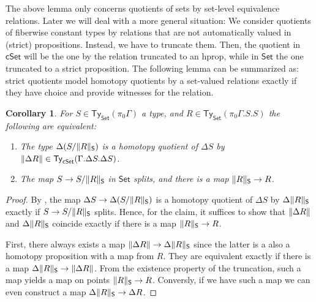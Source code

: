 \documentclass[10pt,a4paper]{article}
\newtheorem{corollary}{Corollary}[section]
\newcommand{\Set}{\mathsf{Set}}
\newcommand{\cSet}{\mathsf{cSet}}
\newcommand\Ty{\mathsf{Ty}}
\begin{document}
The above lemma only concerns quotients of sets by set-level equivalence relations.
Later we will deal with a more general situation: We consider quotients of fiberwise constant types by relations that are not automatically valued in (strict) propositions.
Instead, we have to truncate them.
Then, the quotient in \(\cSet\) will be the one by the relation truncated to an hprop, while in \(\Set\) the one truncated to a strict proposition.
The following lemma can be summarized as: strict quotients model homotopy quotients by a set-valued relations exactly if they have choice and provide witnesses for the relation.

\begin{corollary}\label{prop:set-relevant-quotient-is-homotopy-quotient-iff-surjection-splits-and-witnesses-exist}
  For \(S \in \Ty_{\Set}(\pi_0\Gamma)\) a type, and \(R \in \Ty_{\Set}(\pi_0\Gamma.S.S)\) the following are equivalent:
  \begin{enumerate}[label=(\arabic*)]
    \item The type \(\Delta(S/\trunc*{R})\) is a homotopy quotient of \(\Delta S\) by \(\trunc{\Delta R} \in \Ty_{\cSet}(\Gamma.\Delta S. \Delta S)\).
    \item The map \(S \to S/\trunc*{R}\) in \(\Set\) splits, and there is a map \(\trunc*{R} \to R\).
  \end{enumerate}
\end{corollary}
\begin{proof}
  By , the map \(\Delta S \to \Delta(S/\trunc*{R})\) is a homotopy quotient of \(\Delta S\) by \(\Delta\trunc*{R}\) exactly if \(S \to S/\trunc*{R}\) splits.
  Hence, for the claim, it suffices to show that \(\trunc{\Delta R}\) and \(\Delta\trunc*{R}\) coincide exactly if there is a map \(\trunc*{R} \to R\).
  
  First, there always exists a map \(\trunc{\Delta R} \to \Delta\trunc*{R}\) since the latter is a also a homotopy proposition with a map from \(R\).
  They are equivalent exactly if there is a map \(\Delta\trunc*{R} \to \trunc{\Delta R}\).
  From the existence property of the truncation, such a map yields a map on points \(\trunc*{R} \to R\).
  Conversly, if we have such a map we can even construct a map \(\Delta\trunc*{R} \to \Delta R\).
\end{proof}
\end{document}
